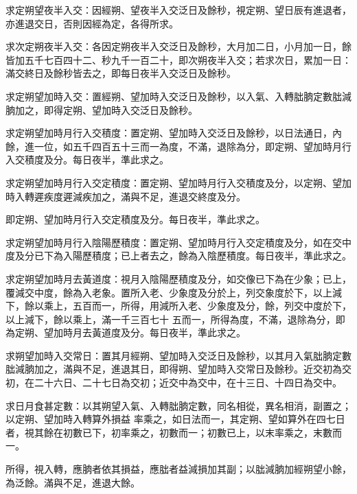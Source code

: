 \begin{pinyinscope}
 求定朔望夜半入交：因經朔、望夜半入交泛日及餘秒，視定朔、望日辰有進退者，亦進退交日，否則因經為定，各得所求。



 求次定朔夜半入交：各因定朔夜半入交泛日及餘秒，大月加二日，小月加一日，餘皆加五千七百四十二、秒九千一百二十，即次朔夜半入交；若求次日，累加一日：滿交終日及餘秒皆去之，即每日夜半入交泛日及餘秒。



 求定朔望加時入交：置經朔、望加時入交泛日及餘秒，以入氣、入轉朏朒定數朏減朒加之，即得定朔、望加時入交泛日及餘秒。



 求定朔望加時月行入交積度：置定朔、望加時入交泛日及餘秒，以日法通日，內餘，進一位，如五千四百五十三而一為度，不滿，退除為分，即定朔、望加時月行入交積度及分。每日夜半，準此求之。



 求定朔望加時月行入交定積度：置定朔、望加時月行入交積度及分，以定朔、望加時入轉遲疾度遲減疾加之，滿與不足，進退交終度及分。



 即定朔、望加時月行入交定積度及分。每日夜半，準此求之。



 求定朔望加時月行入陰陽歷積度：置定朔、望加時月行入交定積度及分，如在交中度及分已下為入陽歷積度；已上者去之，餘為入陰歷積度。每日夜半，準此求之。



 求定朔望加時月去黃道度：視月入陰陽歷積度及分，如交像已下為在少象；已上，覆減交中度，餘為入老象。置所入老、少象度及分於上，列交象度於下，以上減下，餘以乘上，五百而一，所得，用減所入老、少象度及分，餘，列交中度於下，以上減下，餘以乘上，滿一千三百七十
 五而一，所得為度，不滿，退除為分，即為定朔、望加時月去黃道度及分。每日夜半，準此求之。



 求朔望加時入交常日：置其月經朔、望加時入交泛日及餘秒，以其月入氣朏朒定數朏減朒加之，滿與不足，進退其日，即得朔、望加時入交常日及餘秒。近交初為交初，在二十六日、二十七日為交初；近交中為交中，在十三日、十四日為交中。



 求日月食甚定數：以其朔望入氣、入轉朏朒定數，同名相從，異名相消，副置之；以定朔、望加時入轉算外損益
 率乘之，如日法而一，其定朔、望如算外在四七日者，視其餘在初數已下，初率乘之，初數而一；初數已上，以末率乘之，末數而一。



 所得，視入轉，應朒者依其損益，應朏者益減損加其副；以朏減朒加經朔望小餘，為泛餘。滿與不足，進退大餘。




\end{pinyinscope}

